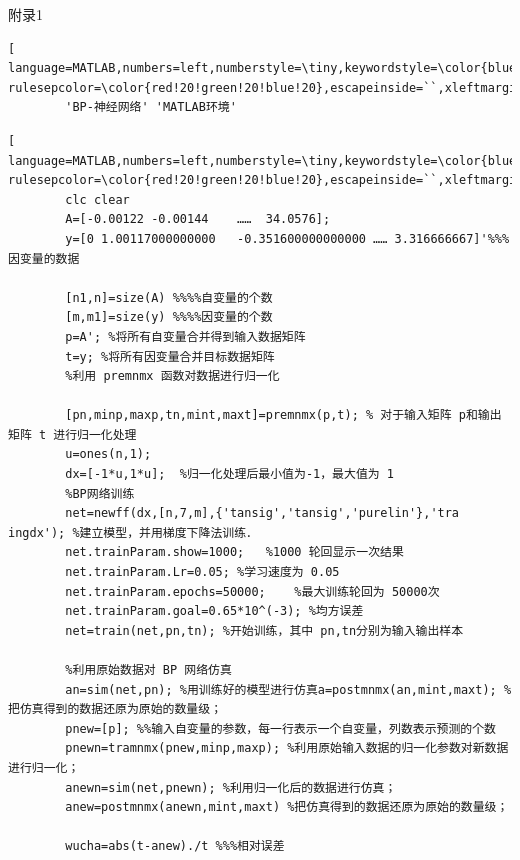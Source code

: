 \documentclass[UTF8]{ctexart}
\begin{document}
\begin{center}
	\sihao \heiti 附录1
	\fontsize{10pt}{16pt}		\selectfont	
	\begin{lstlisting}[ language=MATLAB,numbers=left,numberstyle=\tiny,keywordstyle=\color{blue!70},commentstyle=\color{red!50!green!50!blue!50},frame=shadowbox, rulesepcolor=\color{red!20!green!20!blue!20},escapeinside=``,xleftmargin=2em,xrightmargin=2em,aboveskip=1em] 
		'BP-神经网络' 'MATLAB环境'	
	\end{lstlisting}
	\begin{lstlisting}[ language=MATLAB,numbers=left,numberstyle=\tiny,keywordstyle=\color{blue!70},commentstyle=\color{red!50!green!50!blue!50},frame=shadowbox, rulesepcolor=\color{red!20!green!20!blue!20},escapeinside=``,xleftmargin=2em,xrightmargin=2em,aboveskip=1em] 
		clc clear
		A=[-0.00122	-0.00144	……	34.0576];
		y=[0 1.00117000000000	-0.351600000000000 …… 3.316666667]'%%%因变量的数据
		
		[n1,n]=size(A) %%%%自变量的个数
		[m,m1]=size(y) %%%%因变量的个数
		p=A'; %将所有自变量合并得到输入数据矩阵
		t=y; %将所有因变量合并目标数据矩阵
		%利用 premnmx 函数对数据进行归一化
		
		[pn,minp,maxp,tn,mint,maxt]=premnmx(p,t); % 对于输入矩阵 p和输出矩阵 t 进行归一化处理
		u=ones(n,1);
		dx=[-1*u,1*u];	%归一化处理后最小值为-1，最大值为 1
		%BP网络训练
		net=newff(dx,[n,7,m],{'tansig','tansig','purelin'},'tra ingdx'); %建立模型，并用梯度下降法训练．
		net.trainParam.show=1000;	%1000 轮回显示一次结果
		net.trainParam.Lr=0.05;	%学习速度为 0.05
		net.trainParam.epochs=50000;	%最大训练轮回为 50000次
		net.trainParam.goal=0.65*10^(-3); %均方误差
		net=train(net,pn,tn); %开始训练，其中 pn,tn分别为输入输出样本
		
		%利用原始数据对 BP 网络仿真
		an=sim(net,pn);	%用训练好的模型进行仿真a=postmnmx(an,mint,maxt); % 把仿真得到的数据还原为原始的数量级；
		pnew=[p]; %%输入自变量的参数，每一行表示一个自变量，列数表示预测的个数
		pnewn=tramnmx(pnew,minp,maxp); %利用原始输入数据的归一化参数对新数据进行归一化；
		anewn=sim(net,pnewn); %利用归一化后的数据进行仿真；
		anew=postmnmx(anewn,mint,maxt) %把仿真得到的数据还原为原始的数量级；
		
		wucha=abs(t-anew)./t %%%相对误差
		
	\end{lstlisting}
\end{center}
\newpage
\end{document}
